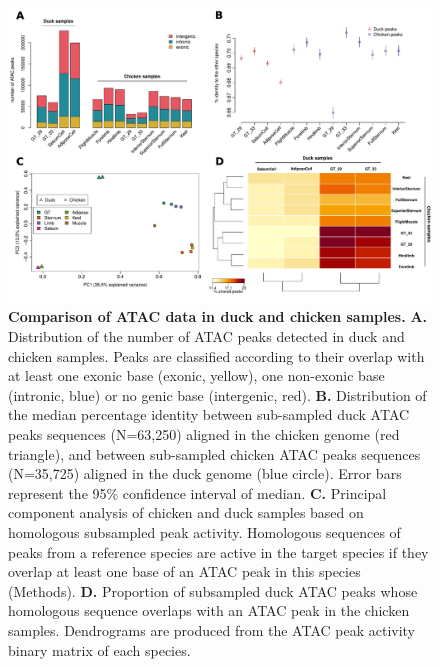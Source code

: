 \begin{figure}[h]
    \centering
    \includegraphics[width=1\textwidth, page=1] {figures/IPLOSS/Fig_peaks.pdf}
    \caption[Comparison of ATAC data in duck and chicken samples.]{
    \textbf{Comparison of ATAC data in duck and chicken samples.}
    \textbf{A.} Distribution of the number of ATAC peaks detected in duck and chicken samples. Peaks are classified according to their overlap with at least one exonic base (exonic, yellow), one non-exonic base (intronic, blue) or no genic base (intergenic, red). 
    \textbf{B.} Distribution of the median percentage identity between sub-sampled duck ATAC peaks sequences (N=63,250) aligned in the chicken genome (red triangle), and between sub-sampled chicken ATAC peaks sequences (N=35,725) aligned in the duck genome (blue circle). Error bars represent the 95\% confidence interval of median. 
    \textbf{C.} Principal component analysis of chicken and duck samples based on homologous subsampled peak activity. Homologous sequences of peaks from a reference species are active in the target species if they overlap at least one base of an ATAC peak in this species (Methods). \textbf{D.} Proportion of subsampled duck ATAC peaks whose homologous sequence overlaps with an ATAC peak in the chicken samples. Dendrograms are produced from the ATAC peak activity binary matrix of each species.  \\
    }
    \label{fig:IPLOSS-fig3}
\end{figure} 

